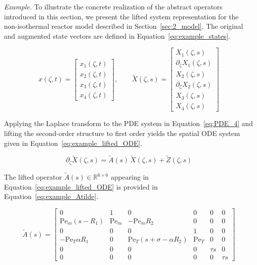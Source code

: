 \noindent\textit{Example.} To illustrate the concrete realization of the abstract operators introduced in this section, we present the lifted system representation for the non-isothermal reactor model described in Section~\ref{sec:2_model}. The original and augmented state vectors are defined in Equation~\eqref{eq:example_states}.

\begin{equation} \label{eq:example_states}
x(\zeta, t) =
\begin{bmatrix}
x_1(\zeta, t) \\
x_2(\zeta, t) \\
x_3(\zeta, t) \\
x_4(\zeta, t)
\end{bmatrix}, \qquad
\tilde{X}(\zeta, s) =
\begin{bmatrix}
X_1(\zeta, s) \\
\partial_\zeta X_1(\zeta, s) \\
X_2(\zeta, s) \\
\partial_\zeta X_2(\zeta, s) \\
X_3(\zeta, s) \\
X_4(\zeta, s)
\end{bmatrix}
\end{equation}

Applying the Laplace transform to the PDE system in Equation~\eqref{eq:PDE_4} and lifting the second-order structure to first order yields the spatial ODE system given in Equation~\eqref{eq:example_lifted_ODE}.

\begin{equation} \label{eq:example_lifted_ODE}
\partial_\zeta \tilde{X}(\zeta, s) = \tilde{A}(s)\, \tilde{X}(\zeta, s) + \tilde{Z}(\zeta, s)
\end{equation}

The lifted operator $\tilde{A}(s) \in \mathbb{R}^{6 \times 6}$ appearing in Equation~\eqref{eq:example_lifted_ODE} is provided in Equation~\eqref{eq:example_Atilde}.

\begin{equation} \label{eq:example_Atilde}
\tilde{A}(s) =
\begin{bmatrix}
0 & 1 & 0 & 0 & 0 & 0 \\
\mathrm{Pe}_m(s - R_1) & \mathrm{Pe}_m & -\mathrm{Pe}_m R_2 & 0 & 0 & 0 \\
0 & 0 & 0 & 1 & 0 & 0 \\
-\mathrm{Pe}_T \alpha R_1 & 0 & \mathrm{Pe}_T(s + \sigma - \alpha R_2) & \mathrm{Pe}_T & 0 & 0 \\
0 & 0 & 0 & 0 & \tau s & 0 \\
0 & 0 & 0 & 0 & 0 & \tau s
\end{bmatrix}
\end{equation}

